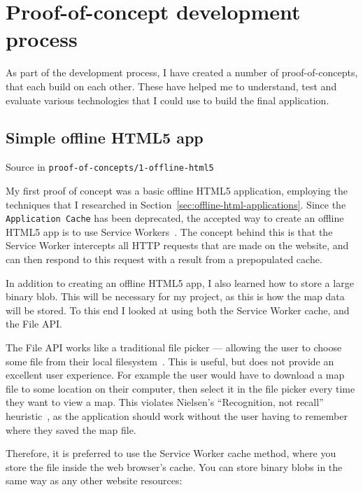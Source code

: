 \documentclass{final_report}
\begin{document}
\clearpage
\chapter{Proof-of-concept development process}

As part of the development process, I have created a number of proof-of-concepts, that each build on each other. These have helped me to understand, test and evaluate various technologies that I could use to build the final application.

\section{Simple offline HTML5 app}

{ \hfill \footnotesize Source in \texttt{proof-of-concepts/1-offline-html5}}

My first proof of concept was a basic offline HTML5 application, employing the techniques that I researched in Section~\ref{sec:offline-html-applications}. Since the \texttt{Application Cache} has been deprecated, the accepted way to create an offline HTML5 app is to use Service Workers~\cite{w3c-service-workers-caches}. The concept behind this is that the Service Worker intercepts all HTTP requests that are made on the website, and can then respond to this request with a result from a prepopulated cache.

In addition to creating an offline HTML5 app, I also learned how to store a large binary blob. This will be necessary for my project, as this is how the map data will be stored. To this end I looked at using both the Service Worker cache, and the File API\@.

The File API works like a traditional file picker --- allowing the user to choose some file from their local filesystem~\cite{w3c-file-api}. This is useful, but does not provide an excellent user experience. For example the user would have to download a map file to some location on their computer, then select it in the file picker every time they want to view a map. This violates Nielsen's ``Recognition, not recall'' heuristic~\cite{nielsen-heuristics}, as the application should work without the user having to remember where they saved the map file.

Therefore, it is preferred to use the Service Worker cache method, where you store the file inside the web browser's cache. You can store binary blobs in the same way as any other website resources:
\end{document}
